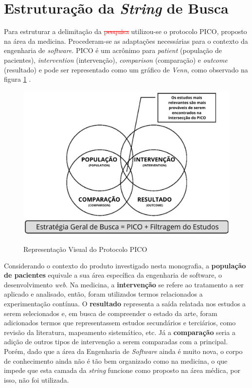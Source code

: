 \section{Estruturação da \textit{String} de Busca}

Para estruturar a delimitação da \textcolor{red}{\st{pesquisa}}  utilizou-se o protocolo PICO, proposto na área da medicina. Procederam-se as adaptações necessárias para o contexto da engenharia de \textit{software}. PICO é um acrônimo para \textit{patient} (população de pacientes), \textit{intervention} (intervenção), \textit{comparison} (comparação) e \textit{outcome} (resultado) e pode ser representado como um gráfico de \textit{Venn}, como observado na figura \ref{fig:pico} \cite{pai_clinical_2004}.




\begin{figure}
    \centering
    \caption{Representação Visual do Protocolo PICO }
    \includegraphics[width=0.75\linewidth]{figuras/PICO.png}
    \label{fig:pico}
\end{figure}

Considerando o contexto do produto investigado nesta monografia, a \textbf{população de pacientes} equivale a sua área específica da engenharia de software, o desenvolvimento \textit{web}. Na medicina, a \textbf{intervenção} se refere ao tratamento a ser aplicado e analisado, então, foram utilizados termos relacionados a experimentação contínua. O \textbf{resultado} representa a saída relatada nos estudos a serem selecionados e, em busca de compreender o estado da arte, foram adicionados termos que representassem estudos secundários e terciários, como revisão da literatura, mapeamento sistemático, etc. Já a \textbf{comparação} seria a adição de outros tipos de intervenção a serem comparadas com a principal. Porém, dado que a área da Engenharia de \textit{Software} ainda é muito nova, o corpo de conhecimento ainda não é tão bem organizado como na medicina, o que impede que esta camada da \textit{string} funcione como proposto na área médica, por isso, não foi utilizada.

